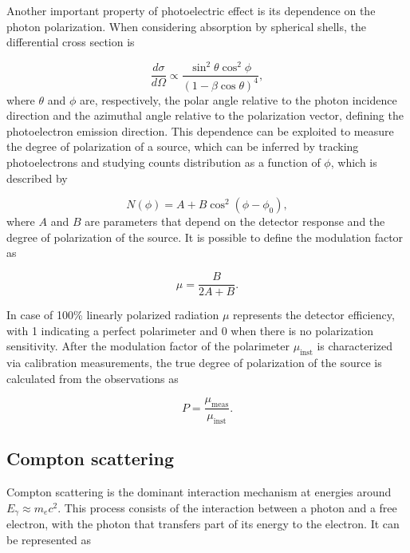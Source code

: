 Another important property of photoelectric effect is its dependence on the photon polarization. When considering absorption by spherical shells, the differential cross section is \cite{muleri2008}

\begin{equation}
\frac{d \sigma}{d \Omega} \propto \frac{\sin^2 \theta \cos^2 \phi}{(1 - \beta \cos \theta)^4},
\label{eq:polarization_photo}
\end{equation}
where $\theta$ and $\phi$ are, respectively, the polar angle relative to the photon incidence direction and the azimuthal angle relative to the polarization vector, defining the photoelectron emission direction. This dependence can be exploited to measure the degree of polarization of a source, which can be inferred by tracking photoelectrons and studying counts distribution as a function of $\phi$, which is described by

\begin{equation}
N(\phi) = A + B \cos^2(\phi - \phi_0),
\end{equation}
where $A$ and $B$ are parameters that depend on the detector response and the degree of polarization of the source. It is possible to define the modulation factor as

\begin{equation}
\mu = \frac{B}{2A + B}.
\end{equation}

In case of 100\% linearly polarized radiation $\mu$ represents the detector efficiency, with 1 indicating a perfect polarimeter and 0 when there is no polarization sensitivity. After the modulation factor of the polarimeter $\mu_{\textrm{inst}}$ is characterized via calibration measurements, the true degree of polarization of the source is calculated from the observations as

\begin{equation}
P = \frac{\mu_{\textrm{meas}}}{\mu_{\textrm{inst}}}.
\end{equation}

\subsection{Compton scattering}

Compton scattering is the dominant interaction mechanism at energies around $E_{\gamma} \approx m_ec^2$. This process consists of the interaction between a photon and a free electron, with the photon that transfers part of its energy to the electron. It can be represented as

